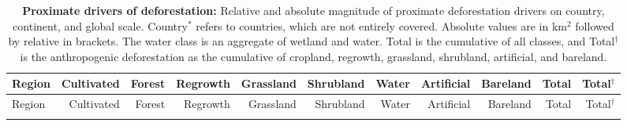 	\begin{scriptsize}
	\begin{landscape}
		\begin{center}
			\begin{longtable}[ht]{lrrrrrrrrrr}
			\caption[Proximate drivers of deforestation]{\textbf{Proximate drivers of deforestation:} Relative and absolute magnitude of proximate deforestation drivers on country, continent, and global scale. Country$^*$ refers to countries, which are not entirely covered. Absolute values are in km$^2$ followed by relative in brackets. The water class is an aggregate of wetland and water. Total is the cumulative of all classes, and Total$^{\dagger}$ is the anthropogenic deforestation as the cumulative of cropland, regrowth, grassland, shrubland, artificial, and bareland.} \label{tab:proximate_driver}\\

			\hline
			Region&Cultivated&Forest&Regrowth&Grassland&Shrubland&Water&Artificial&Bareland&Total&Total$^\dagger$\\
			\hline
			\endfirsthead

			\hline
			Region&Cultivated&Forest&Regrowth&Grassland&Shrubland&Water&Artificial&Bareland&Total&Total$^\dagger$\\
			\hline
			\endhead

			\hline
			\endfoot


\end{longtable}
\end{center}
\end{landscape}
\end{scriptsize}
